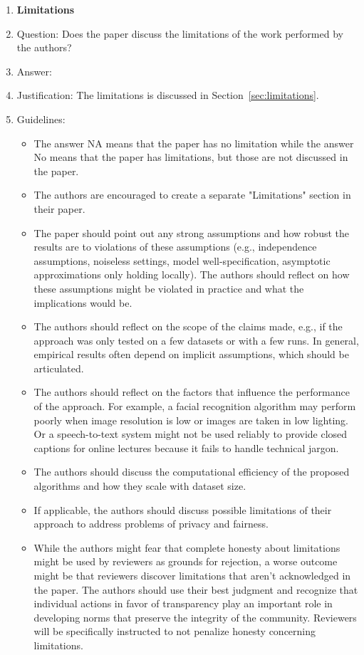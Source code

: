 \documentclass[11pt]{article}
\theoremstyle{plain}
\theoremstyle{definition}
\theoremstyle{remark}
\renewcommand{\^}[1]{^{(#1)}}
\begin{document}
\begin{enumerate}
\item {\bf Limitations}
    \item[] Question: Does the paper discuss the limitations of the work performed by the authors?
    \item[] Answer: \answerYes{} 
    \item[] Justification: The limitations is discussed in Section~\ref{sec:limitations}.
    \item[] Guidelines:
    \begin{itemize}
        \item The answer NA means that the paper has no limitation while the answer No means that the paper has limitations, but those are not discussed in the paper. 
        \item The authors are encouraged to create a separate "Limitations" section in their paper.
        \item The paper should point out any strong assumptions and how robust the results are to violations of these assumptions (e.g., independence assumptions, noiseless settings, model well-specification, asymptotic approximations only holding locally). The authors should reflect on how these assumptions might be violated in practice and what the implications would be.
        \item The authors should reflect on the scope of the claims made, e.g., if the approach was only tested on a few datasets or with a few runs. In general, empirical results often depend on implicit assumptions, which should be articulated.
        \item The authors should reflect on the factors that influence the performance of the approach. For example, a facial recognition algorithm may perform poorly when image resolution is low or images are taken in low lighting. Or a speech-to-text system might not be used reliably to provide closed captions for online lectures because it fails to handle technical jargon.
        \item The authors should discuss the computational efficiency of the proposed algorithms and how they scale with dataset size.
        \item If applicable, the authors should discuss possible limitations of their approach to address problems of privacy and fairness.
        \item While the authors might fear that complete honesty about limitations might be used by reviewers as grounds for rejection, a worse outcome might be that reviewers discover limitations that aren't acknowledged in the paper. The authors should use their best judgment and recognize that individual actions in favor of transparency play an important role in developing norms that preserve the integrity of the community. Reviewers will be specifically instructed to not penalize honesty concerning limitations.
    \end{itemize}


\end{enumerate}
\end{document}
